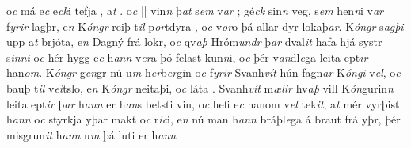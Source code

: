o\textit{c} má e\textit{c}
e\textit{ck}i tefja  , a\textit{t}  .   o\textit{c} 
||
 vin\textit{n} þ\textit{at} s\textit{em}  v\textit{ar} ; gé\textit{ck}  sin\textit{n} veg,   s\textit{em} hen\textit{n}i  v\textit{ar} f\textit{yrir}
lagþr, e\textit{n} K\textit{óngr} reiþ t\textit{il} p\textit{or}tdyra  , o\textit{c} v\textit{or}o þá allar  dyr lokaþ\textit{ar}.
K\textit{óngr} s\textit{agþi}  upp a\textit{t} brjóta, e\textit{n} Dagný   frá  lokr, o\textit{c} qv\textit{aþ} Hróm\textit{undr}
þ\textit{ar} dval\textit{it} hafa hjá systr s\textit{inni} o\textit{c} hér
hygg  e\textit{c} h\textit{ann}  v\textit{er}a þó felast kun\textit{n}i, o\textit{c}  þér v\textit{an}dl\textit{e}ga leita   ept\textit{ir} han\textit{om}. K\textit{óngr} g\textit{en}gr nú
u\textit{m} h\textit{er}b\textit{er}gin o\textit{c} f\textit{yrir}
Svanh\textit{vít} hún fagn\textit{ar} K\textit{óngi}
v\textit{el}, o\textit{c} bauþ t\textit{il} v\textit{ei}tslo, e\textit{n}
K\textit{óngr} neitaþi, o\textit{c}  láta  . 
Svanh\textit{vít} m\textit{ælir} hv\textit{aþ} vill
K\textit{ón}gurin\textit{n} leita  ept\textit{ir}  
þ\textit{ar}   h\textit{ann} er h\textit{an}s betsti vin, o\textit{c} hefi e\textit{c}
hanom   v\textit{el} tek\textit{it}, a\textit{t} mér vyrþist h\textit{ann}  o\textit{c} styrkja yþar makt o\textit{c} r\textit{ic}i,
e\textit{n} nú man h\textit{ann} bráþl\textit{e}ga á braut  frá yþr,   þér misgrun\textit{it} h\textit{ann} u\textit{m} þá luti er h\textit{ann}
